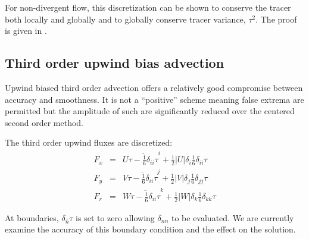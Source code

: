 For non-divergent flow, this discretization can be shown to conserve
the tracer both locally and globally and to globally conserve tracer
variance, $\tau^2$. The proof is given in \cite{adcroft:95,adcroft:97}.



\subsection{Third order upwind bias advection}

Upwind biased third order advection offers a relatively good
compromise between accuracy and smoothness. It is not a ``positive''
scheme meaning false extrema are permitted but the amplitude of such
are significantly reduced over the centered second order method.

The third order upwind fluxes are discretized:
\begin{eqnarray}
F_x & = & U \overline{\tau - \frac{1}{6} \delta_{ii} \tau}^i
         + \frac{1}{2} |U| \delta_i \frac{1}{6} \delta_{ii} \tau \\
F_y & = & V \overline{\tau - \frac{1}{6} \delta_{ii} \tau}^j
         + \frac{1}{2} |V| \delta_j \frac{1}{6} \delta_{jj} \tau \\
F_r & = & W \overline{\tau - \frac{1}{6} \delta_{ii} \tau}^k
         + \frac{1}{2} |W| \delta_k \frac{1}{6} \delta_{kk} \tau 
\end{eqnarray}

At boundaries, $\delta_{\hat{n}} \tau$ is set to zero allowing
$\delta_{nn}$ to be evaluated. We are currently examine the accuracy
of this boundary condition and the effect on the solution.

